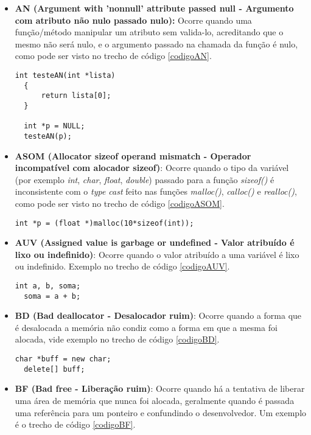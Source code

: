 \begin{itemize}
  \item \textbf{AN (Argument with 'nonnull' attribute passed null - Argumento com atributo não nulo passado nulo):} Ocorre
    quando uma função/método manipular um atributo sem valida-lo, acreditando que o mesmo não será nulo, e o argumento passado
    na chamada da função é nulo, como pode ser visto no trecho de código \ref{codigoAN}.

    \begin{lstlisting}[caption={Código exemplo AN}, label=codigoAN]
  int testeAN(int *lista)
  {
      return lista[0];     
  }
  
  int *p = NULL;
  testeAN(p);
    \end{lstlisting}

  \item \textbf{ASOM (Allocator sizeof operand mismatch - Operador incompatível com alocador sizeof)}: Ocorre quando o tipo
    da variável (por exemplo \textit{int}, \textit{char}, \textit{float}, \textit{double}) passado para a função 
    \textit{sizeof()} é inconsistente com o \textit{type cast} feito nas funções \textit{malloc()}, \textit{calloc()} e 
    \textit{realloc()}, como pode ser visto no trecho de código \ref{codigoASOM}.

    \begin{lstlisting}[caption={Código exemplo ASOM}, label=codigoASOM]
  int *p = (float *)malloc(10*sizeof(int));
    \end{lstlisting}
  \item \textbf{AUV (Assigned value is garbage or undefined - Valor atribuído é lixo ou indefinido)}: Ocorre quando o valor 
    atribuído a uma variável é lixo ou indefinido. Exemplo no trecho de código \ref{codigoAUV}.

    \begin{lstlisting}[caption={Código exemplo AUV}, label=codigoAUV]
  int a, b, soma;
  soma = a + b;
    \end{lstlisting}
  \item \textbf{BD (Bad deallocator - Desalocador ruim)}: Ocorre quando a forma que é desalocada a memória não condiz como a
    forma em que a mesma foi alocada, vide exemplo no trecho de código \ref{codigoBD}.

    \begin{lstlisting}[caption={Código exemplo BD}, label=codigoBD]
  char *buff = new char;
  delete[] buff;
    \end{lstlisting}
  \item \textbf{BF (Bad free - Liberação ruim)}: Ocorre quando há a tentativa de liberar uma área de memória que nunca foi
    alocada, geralmente quando é passada uma referência para um ponteiro e confundindo o desenvolvedor. Um exemplo é o trecho 
    de código \ref{codigoBF}.


\end{itemize}
